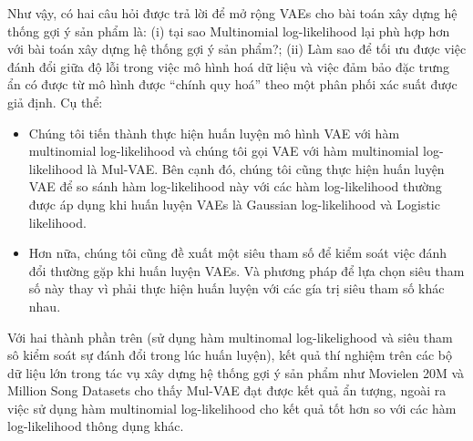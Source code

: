 Như vậy, có hai câu hỏi được trả lời để mở rộng VAEs cho bài toán xây dựng hệ thống gợi ý sản phẩm là: (i) tại sao Multinomial log-likelihood lại phù hợp hơn với bài toán xây dựng hệ thống gợi ý sản phẩm?; (ii) Làm sao để tối ưu được việc đánh đổi giữa độ lỗi trong việc mô hình hoá dữ liệu và việc đảm bảo đặc trưng ẩn có được từ mô hình được ``chính quy hoá'' theo một phân phối xác suất được giả định. Cụ thể:
\begin{itemize}
    \item Chúng tôi tiến thành thực hiện huấn luyện mô hình VAE với hàm multinomial log-likelihood và chúng tôi gọi VAE với hàm multinomial log-likelihood là Mul-VAE. Bên cạnh đó, chúng tôi cũng thực hiện huấn luyện VAE để so sánh hàm log-likelihood này với các hàm log-likelihood thường được áp dụng khi huấn luyện VAEs là Gaussian log-likelihood và Logistic likelihood.
    \item Hơn nữa, chúng tôi cũng đề xuất một siêu tham số để kiểm soát việc đánh đổi thường gặp khi huấn luyện VAEs. Và phương pháp để lựa chọn siêu tham số này thay vì phải thực hiện huấn luyện với các gía trị siêu tham số khác nhau.
\end{itemize}

Với hai thành phần trên (sử dụng hàm multinomal log-likelighood và siêu tham sô kiểm soát sự đánh đổi trong lúc huấn luyện), kết quả thí nghiệm trên các bộ dữ liệu lớn trong tác vụ xây dựng hệ thống gợi ý sản phẩm như Movielen 20M và Million Song Datasets cho thấy Mul-VAE đạt được kết quả ẩn tượng, ngoài ra việc sử dụng hàm multinomial log-likelihood cho kết quả tốt hơn so với các hàm log-likelihood thông dụng khác.





